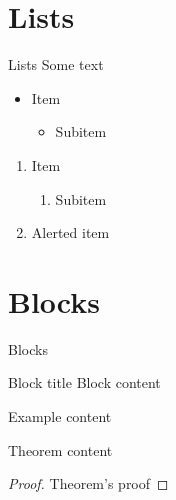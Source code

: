 {
    \frame{\titlepage}
}

\section{Lists}
\begin{frame}{Lists}
    Some text
    \begin{itemize}
        \item Item
        \begin{itemize}
            \item Subitem
        \end{itemize}
    \end{itemize}
    \begin{enumerate}
        \item Item
        \begin{enumerate}
            \item Subitem
        \end{enumerate}
        \item \alert{Alerted item}
    \end{enumerate}
\end{frame}

\section{Blocks}
\begin{frame}{Blocks}
    \begin{block}{Block title}
        Block content
    \end{block}
    \begin{example}
        Example content
    \end{example}
    \begin{theorem}
        Theorem content
    \end{theorem}
    \begin{proof}
        Theorem's proof
    \end{proof}
\end{frame}

